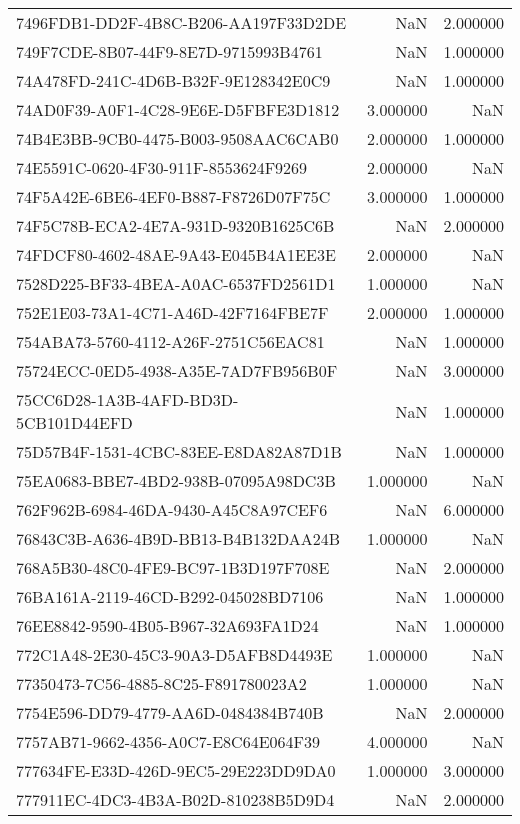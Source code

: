 \begin{tabular}{lrr}
7496FDB1-DD2F-4B8C-B206-AA197F33D2DE & NaN & 2.000000 \\
749F7CDE-8B07-44F9-8E7D-9715993B4761 & NaN & 1.000000 \\
74A478FD-241C-4D6B-B32F-9E128342E0C9 & NaN & 1.000000 \\
74AD0F39-A0F1-4C28-9E6E-D5FBFE3D1812 & 3.000000 & NaN \\
74B4E3BB-9CB0-4475-B003-9508AAC6CAB0 & 2.000000 & 1.000000 \\
74E5591C-0620-4F30-911F-8553624F9269 & 2.000000 & NaN \\
74F5A42E-6BE6-4EF0-B887-F8726D07F75C & 3.000000 & 1.000000 \\
74F5C78B-ECA2-4E7A-931D-9320B1625C6B & NaN & 2.000000 \\
74FDCF80-4602-48AE-9A43-E045B4A1EE3E & 2.000000 & NaN \\
7528D225-BF33-4BEA-A0AC-6537FD2561D1 & 1.000000 & NaN \\
752E1E03-73A1-4C71-A46D-42F7164FBE7F & 2.000000 & 1.000000 \\
754ABA73-5760-4112-A26F-2751C56EAC81 & NaN & 1.000000 \\
75724ECC-0ED5-4938-A35E-7AD7FB956B0F & NaN & 3.000000 \\
75CC6D28-1A3B-4AFD-BD3D-5CB101D44EFD & NaN & 1.000000 \\
75D57B4F-1531-4CBC-83EE-E8DA82A87D1B & NaN & 1.000000 \\
75EA0683-BBE7-4BD2-938B-07095A98DC3B & 1.000000 & NaN \\
762F962B-6984-46DA-9430-A45C8A97CEF6 & NaN & 6.000000 \\
76843C3B-A636-4B9D-BB13-B4B132DAA24B & 1.000000 & NaN \\
768A5B30-48C0-4FE9-BC97-1B3D197F708E & NaN & 2.000000 \\
76BA161A-2119-46CD-B292-045028BD7106 & NaN & 1.000000 \\
76EE8842-9590-4B05-B967-32A693FA1D24 & NaN & 1.000000 \\
772C1A48-2E30-45C3-90A3-D5AFB8D4493E & 1.000000 & NaN \\
77350473-7C56-4885-8C25-F891780023A2 & 1.000000 & NaN \\
7754E596-DD79-4779-AA6D-0484384B740B & NaN & 2.000000 \\
7757AB71-9662-4356-A0C7-E8C64E064F39 & 4.000000 & NaN \\
777634FE-E33D-426D-9EC5-29E223DD9DA0 & 1.000000 & 3.000000 \\
777911EC-4DC3-4B3A-B02D-810238B5D9D4 & NaN & 2.000000 \\

\end{tabular}
